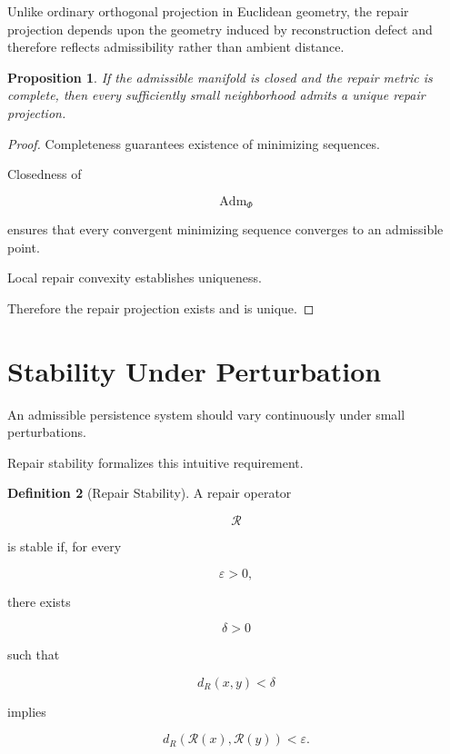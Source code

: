 \documentclass[11pt]{book}
\numberwithin{equation}{chapter}
\theoremstyle{definition}
\newtheorem{definition}{Definition}[chapter]
\theoremstyle{plain}
\newtheorem{proposition}[definition]{Proposition}
\begin{document}
Unlike ordinary orthogonal projection in Euclidean geometry, the repair
projection depends upon the geometry induced by reconstruction defect
and therefore reflects admissibility rather than ambient distance.

\begin{proposition}

If the admissible manifold is closed and the repair metric is complete,
then every sufficiently small neighborhood admits a unique repair
projection.

\end{proposition}

\begin{proof}

Completeness guarantees existence of minimizing sequences.

Closedness of

\[
\operatorname{Adm}_{\Phi}
\]

ensures that every convergent minimizing sequence converges to an
admissible point.

Local repair convexity establishes uniqueness.

Therefore the repair projection exists and is unique.

\end{proof}

\section{Stability Under Perturbation}

An admissible persistence system should vary continuously under small
perturbations.

Repair stability formalizes this intuitive requirement.

\begin{definition}[Repair Stability]

A repair operator

\[
\mathcal R
\]

is stable if, for every

\[
\varepsilon>0,
\]

there exists

\[
\delta>0
\]

such that

\[
d_R(x,y)<\delta
\]

implies

\[
d_R(\mathcal R(x),\mathcal R(y))
<
\varepsilon.
\]

\end{definition}
\end{document}
